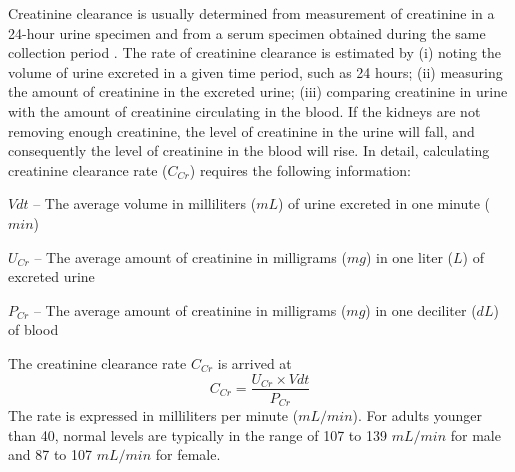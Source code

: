 \documentclass[11pt]{article}
\begin{document}
\begin{enumerate*}[{[a)]}]
    Creatinine clearance is usually determined from measurement of creatinine in a 24-hour urine specimen and from a serum specimen obtained during the same collection period \citep{traynor2006measure}. The rate of creatinine clearance is estimated by (i) noting the volume of urine excreted in a given time period, such as 24 hours; (ii) measuring the amount of creatinine in the excreted urine; (iii) comparing creatinine in urine with the amount of creatinine circulating in the blood. If the kidneys are not removing enough creatinine, the level of creatinine in the urine will fall, and consequently the level of creatinine in the blood will rise. In detail, calculating creatinine clearance rate ($C_{Cr}$) requires the following information:
    \begin{itemize*}
        \item $Vdt$ -- The average volume in milliliters ($mL$) of urine excreted in one minute ($min$)
        \item $U_{Cr}$ -- The average amount of creatinine in milligrams ($mg$) in one liter ($L$) of excreted urine
        \item $P_{Cr}$ -- The average amount of creatinine in milligrams ($mg$) in one deciliter ($dL$) of blood
    \end{itemize*}
    The creatinine clearance rate $C_{Cr}$ is arrived at 
    \begin{equation*}
        C_{Cr} = \frac{U_{Cr}\times Vdt}{P_{Cr}}
    \end{equation*}
    The rate is expressed in milliliters per minute ($mL/min$). For adults younger than 40, normal levels are typically in the range of 107 to 139 $mL/min$ for male and 87 to 107 $mL/min$ for female.
    

\end{enumerate*}
\end{document}
